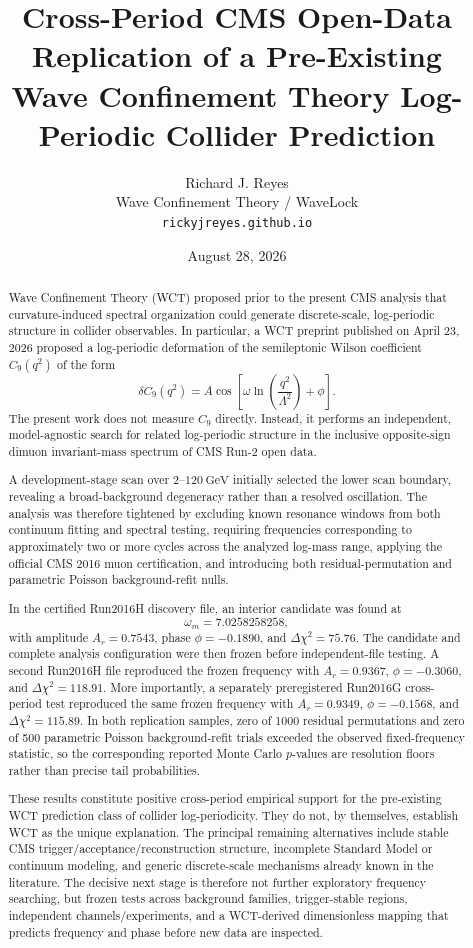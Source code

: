 \documentclass[11pt]{article}
\title{\textbf{Cross-Period CMS Open-Data Replication of a Pre-Existing\\
Wave Confinement Theory Log-Periodic Collider Prediction}}
\author{Richard J. Reyes\\
Wave Confinement Theory / WaveLock\\
\texttt{rickyjreyes.github.io}}
\date{August 28, 2026}
\begin{document}
\maketitle

\begin{abstract}
Wave Confinement Theory (WCT) proposed prior to the present CMS analysis that
curvature-induced spectral organization could generate discrete-scale,
log-periodic structure in collider observables.  In particular, a WCT preprint
published on April 23, 2026 proposed a log-periodic deformation of the
semileptonic Wilson coefficient \(C_9(q^2)\) of the form
\[
\delta C_9(q^2)
=
A\cos\!\left[
\omega\ln\!\left(\frac{q^2}{\Lambda^2}\right)+\phi
\right].
\]
The present work does not measure \(C_9\) directly.  Instead, it performs an
independent, model-agnostic search for related log-periodic structure in the
inclusive opposite-sign dimuon invariant-mass spectrum of CMS Run-2 open data.

A development-stage scan over \(2\)--\(120~\mathrm{GeV}\) initially selected
the lower scan boundary, revealing a broad-background degeneracy rather than a
resolved oscillation.  The analysis was therefore tightened by excluding
known resonance windows from both continuum fitting and spectral testing,
requiring frequencies corresponding to approximately two or more cycles
across the analyzed log-mass range, applying the official CMS 2016 muon
certification, and introducing both residual-permutation and parametric
Poisson background-refit nulls.

In the certified Run2016H discovery file, an interior candidate was found at
\[
\omega_m = 7.0258258258,
\]
with amplitude \(A_r=0.7543\), phase \(\phi=-0.1890\), and
\(\Delta\chi^2=75.76\).  The candidate and complete analysis configuration
were then frozen before independent-file testing.  A second Run2016H file
reproduced the frozen frequency with \(A_r=0.9367\),
\(\phi=-0.3060\), and \(\Delta\chi^2=118.91\).  More importantly, a separately
preregistered Run2016G cross-period test reproduced the same frozen frequency
with \(A_r=0.9349\), \(\phi=-0.1568\), and
\(\Delta\chi^2=115.89\).  In both replication samples, zero of 1000 residual
permutations and zero of 500 parametric Poisson background-refit trials
exceeded the observed fixed-frequency statistic, so the corresponding
reported Monte Carlo \(p\)-values are resolution floors rather than precise
tail probabilities.

These results constitute positive cross-period empirical support for the
pre-existing WCT prediction class of collider log-periodicity.  They do not,
by themselves, establish WCT as the unique explanation.  The principal
remaining alternatives include stable CMS trigger/acceptance/reconstruction
structure, incomplete Standard Model or continuum modeling, and generic
discrete-scale mechanisms already known in the literature.  The decisive next
stage is therefore not further exploratory frequency searching, but frozen
tests across background families, trigger-stable regions, independent
channels/experiments, and a WCT-derived dimensionless mapping that predicts
frequency and phase before new data are inspected.
\end{abstract}
\end{document}
